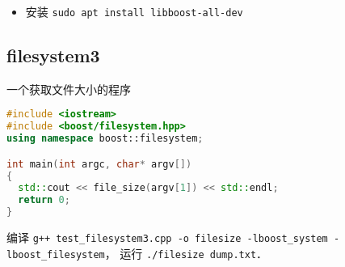 
\begin{itemize}
\item 安装 \verb|sudo apt install libboost-all-dev|
\end{itemize}

\subsection{filesystem3}
一个获取文件大小的程序
\begin{lstlisting}[language=cpp]
#include <iostream>
#include <boost/filesystem.hpp>
using namespace boost::filesystem;

int main(int argc, char* argv[])
{
  std::cout << file_size(argv[1]) << std::endl;
  return 0;
}
\end{lstlisting}

编译 \verb|g++ test_filesystem3.cpp -o filesize -lboost_system -lboost_filesystem|， 运行 \verb|./filesize dump.txt|．